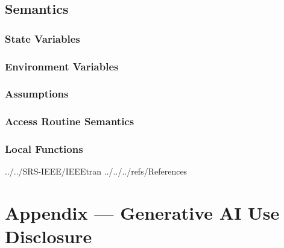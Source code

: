 \documentclass[12pt, titlepage]{article}
\begin{document}
\subsection{Semantics}

\subsubsection{State Variables}


\subsubsection{Environment Variables}


\subsubsection{Assumptions}


\subsubsection{Access Routine Semantics}

\subsubsection{Local Functions}

\newpage

 {../../SRS-IEEE/IEEEtran}
 {../../../refs/References}

\newpage

\newpage{}

\section{Appendix --- Generative AI Use Disclosure}
\end{document}

